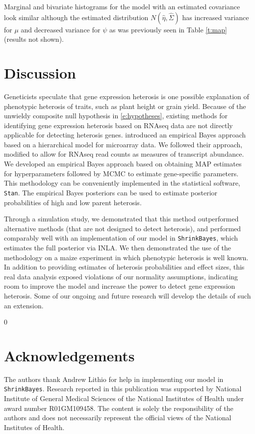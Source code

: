 \documentclass[useAMS,usenatbib,referee]{biom}
\newcommand{\blind}{0} %
\newcommand{\ShrinkBayes}{{\tt ShrinkBayes}}
\newcommand{\RNAseq}{RNAseq}
\begin{document}
Marginal and bivariate histograms for the model with an estimated covariance look similar although the estimated distribution $N(\hat{\eta},\hat{\Sigma})$ has increased variance for $\mu$ and decreased variance for $\psi$ as was previously seen in Table \ref{t:map} (results not shown). 

\section{Discussion}
\label{s:discussion}

Geneticists speculate that gene expression heterosis is one possible explanation of phenotypic heterosis of traits, such as plant height or grain yield. Because of the unwieldy composite null hypothesis in \eqref{e:hypotheses}, existing methods for identifying gene expression heterosis based on \RNAseq{} data are not directly applicable for detecting heterosis genes. \cite{ji2014estimation} introduced an empirical Bayes approach based on a hierarchical model for microarray data. We followed their approach, modified to allow for \RNAseq{} read counts as measures of transcript abundance. We developed an empirical Bayes approach based on obtaining MAP estimates for hyperparameters followed by MCMC to estimate gene-specific parameters. This methodology can be conveniently implemented in the statistical software, {\tt Stan}. The empirical Bayes posteriors can be used to estimate posterior probabilities of high and low parent heterosis.  

Through a simulation study, we demonstrated that this method outperformed alternative methods (that are not designed to detect heterosis), and performed comparably well with an implementation of our model in \ShrinkBayes{}, which estimates the full posterior via INLA. We then demonstrated the use of the methodology on a maize experiment in which phenotypic heterosis is well known. 
In addition to providing estimates of heterosis probabilities and effect sizes, this real data analysis exposed violations of our normality assumptions, indicating room to improve the model and increase the power to detect gene expression heterosis. Some of our ongoing and future research will develop the details of such an extension.





\backmatter %

\blind{
\section*{Acknowledgements}

The authors thank Andrew Lithio for help in implementing our model in \ShrinkBayes{}. Research reported in this publication was supported by National Institute of General Medical Sciences of the National Institutes of Health under award number R01GM109458. The content is solely the responsibility of the authors and does not necessarily represent the official views of the National Institutes of Health.
} \fi
\end{document}
